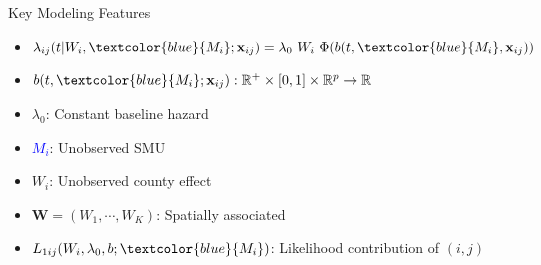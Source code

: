 \documentclass{beamer}
\begin{document}
\begin{frame}{Key Modeling Features}
\begin{itemize}
\vfill \item
  \(\lambda_{ij}(t| W_i,\textcolor{blue}{M_i};\mathbf{x}_{ij}) = \lambda_0 \ W_i\  \Phi(b(t, \textcolor{blue}{M_i},\mathbf{x}_{ij}))\) 
   \vfill \item  $b(t,\textcolor{blue}{M_i};\mathbf{x}_{ij}): \mathbb{R}^+ \times [0,1]\times \mathbb{R}^{p} \to \mathbb{R}$
  \vfill \item
  \(\lambda_0\): Constant baseline hazard 
  \vfill \item \textcolor{blue}{$M_i$}: Unobserved SMU
\vfill \item
  \(W_i\): Unobserved county effect
\vfill \item \(\mathbf{W}=(W_1,\cdots,W_K)\): Spatially associated
\vfill \item $L_{1ij}(W_i, \lambda_0,b; \textcolor{blue}{M_i})$: Likelihood contribution of $(i,j)$ 

 

   

\end{itemize}    
    
\end{frame}
\end{document}
